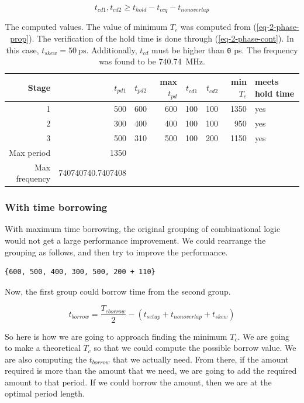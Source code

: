 \documentclass[hidelinks, 12pt]{article}
\begin{document}
\begin{equation}
\label{eq-2-phase-cont}
t_{cd1}, t_{cd2} \geq t_{hold} - t_{ccq} - t_{nonoverlap}
\end{equation}


\begin{table}[htbp]
\caption{\label{tab-q1-1}The computed values. The value of minimum \(T_{c}\) was computed from (\ref{eq-2-phase-prop}). The verification of the hold time is done through (\ref{eq-2-phase-cont}). In this case, \(t_{skew}=\qty{50}{\pico\s}\). Additionally, \(t_{cd}\) must be higher than \texttt{0} \unit{\pico\s}. The frequency was found to be \qty{740.74}{\mega\hertz}.}
\centering
\begin{tabular}{rrrrrrrl}
Stage & \(t_{pd1}\) & \(t_{pd2}\) & max \(t_{pd}\) & \(t_{cd1}\) & \(t_{cd2}\) & min \(T_{c}\) & meets hold time\\
\hline
1 & 500 & 600 & 600 & 100 & 100 & 1350 & yes\\
2 & 300 & 400 & 400 & 100 & 100 & 950 & yes\\
3 & 500 & 310 & 500 & 100 & 200 & 1150 & yes\\
\hline
Max period & 1350 &  &  &  &  &  & \\
Max frequency & 740740740.7407408 &  &  &  &  &  & \\
\end{tabular}
\end{table}
\subsubsection*{With time borrowing}
\label{sec:orgbf4d18b}
With maximum time borrowing, the original grouping of combinational logic would not get a large performance improvement.
We could rearrange the grouping as follows, and then try to improve the performance.

\begin{verbatim}
{600, 500, 400, 300, 500, 200 + 110}
\end{verbatim}

Now, the first group could borrow time from the second group.

\begin{equation}
\label{eq-borrow-time}
t_{borrow} = \frac{T_{c borrow}}{2} - \left( t_{setup} + t_{nonoverlap} + t_{skew} \right)
\end{equation}

So here is how we are going to approach finding the minimum \(T_{c}\). We are going to make a theoretical \(T_{c}\) so that we could compute the possible borrow value.
We are also computing the \(t_{borrow}\) that we actually need.
From there, if the amount required is more than the amount that we need, we are going to add the required amount to that period.
If we could borrow the amount, then we are at the optimal period length.
\end{document}
